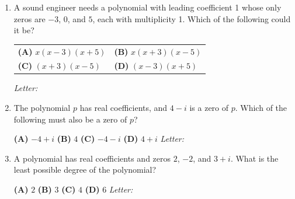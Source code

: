 \documentclass[10pt]{article}
\begin{document}
\begin{enumerate}[leftmargin=1.9em, itemsep=12pt]

\item A sound engineer needs a polynomial with leading coefficient 1 whose only zeros are
      $-3$, $0$, and $5$, each with multiplicity 1. Which of the following could it be?

      \smallskip
      \begin{tabular}{@{}p{4.2cm}p{4.2cm}@{}}
      \textbf{(A)} $x(x - 3)(x + 5)$ & \textbf{(B)} $x(x + 3)(x - 5)$ \\[2pt]
      \textbf{(C)} $(x + 3)(x - 5)$ & \textbf{(D)} $(x - 3)(x + 5)$
      \end{tabular}
      \hfill\textit{Letter:}~\gradedblank[id=ap1, type=choice, points=1, answer=B]{0.42in}{13pt}

\item The polynomial $p$ has real coefficients, and $4 - i$ is a zero of $p$. Which of the
      following must also be a zero of $p$?

      \smallskip
      \textbf{(A)} $-4 + i$ \hspace{2.2em} \textbf{(B)} $4$ \hspace{2.2em} \textbf{(C)} $-4 - i$ \hspace{2.2em} \textbf{(D)} $4 + i$ \hfill\textit{Letter:}~\gradedblank[id=ap2, type=choice, points=1, answer=D]{0.42in}{13pt}

\item A polynomial has real coefficients and zeros $2$, $-2$, and $3 + i$. What is the least
      possible degree of the polynomial?

      \smallskip
      \textbf{(A)} $2$ \hspace{2.2em} \textbf{(B)} $3$ \hspace{2.2em} \textbf{(C)} $4$ \hspace{2.2em} \textbf{(D)} $6$ \hfill\textit{Letter:}~\gradedblank[id=ap3, type=choice, points=1, answer=C]{0.42in}{13pt}


\end{enumerate}
\end{document}
